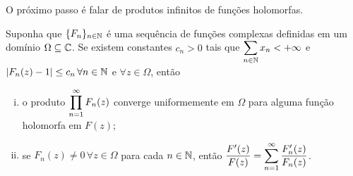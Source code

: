     O próximo passo é falar de produtos infinitos de funções holomorfas.
    \begin{proposicao}
    \label{prop:prod-inf-func-holom}
        Suponha que $\{ F_n \}_{n\in\mathbb{N}}$ é uma sequência de funções complexas
        definidas em um domínio $\Omega\subseteq\mathbb{C}$. Se existem constantes
        $c_n>0$ tais que $\displaystyle{ \sum_{n\in\mathbb{N}} x_n < +\infty }$ e 
        $|F_n(z) - 1| \leq c_n \, \forall n\in\mathbb{N}$ e $\forall z\in\Omega$, então
        \begin{enumerate}[(i)]
            \item o produto $\displaystyle{ \prod_{n=1}^{\infty} F_n(z) }$ converge
            uniformemente em $\Omega$ para alguma função holomorfa em $F(z)$;
            \item se $F_n(z) \neq 0 \, \forall z\in\Omega$ para cada $n\in\mathbb{N}$, 
            então $\displaystyle{ \frac{F'(z)}{F(z)} = 
            \sum_{n=1}^{\infty} \frac{F_n'(z)}{F_n(z)} }$.
        \end{enumerate}
    \end{proposicao}
